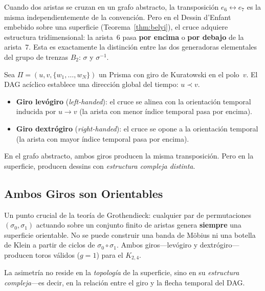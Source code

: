 \documentclass[11pt, a4paper, openany]{book}
\begin{document}
Cuando dos aristas se cruzan en un grafo abstracto, la transposici\'on
$e_6 \leftrightarrow e_7$ es la misma independientemente de la
convenci\'on. Pero en el Dessin d'Enfant embebido sobre una superficie
(Teorema~\ref{thm:belyi}), el cruce adquiere estructura
tridimensional: la arista~6 pasa \textbf{por encima} o
\textbf{por debajo} de la arista~7. Esta es exactamente la distinci\'on
entre las dos generadoras elementales del grupo de trenzas $B_2$:
$\sigma$ y $\sigma^{-1}$.

\begin{definition}
\label{def:twist-chirality}
Sea $\Pi = (u, v, \{w_1, \ldots, w_N\})$ un Prisma con giro de
Kuratowski en el polo~$v$. El DAG ac\'iclico establece una direcci\'on
global del tiempo: $u \prec v$.
\begin{itemize}
  \item \textbf{Giro lev\'ogiro} (\emph{left-handed}): el cruce se
    alinea con la orientaci\'on temporal inducida por $u \to v$
    (la arista con menor \'indice temporal pasa por encima).
  \item \textbf{Giro dextr\'ogiro} (\emph{right-handed}): el cruce se
    opone a la orientaci\'on temporal (la arista con mayor \'indice
    temporal pasa por encima).
\end{itemize}
\end{definition}

En el grafo abstracto, ambos giros producen la misma transposici\'on.
Pero en la superficie, producen dessins con \emph{estructura compleja
distinta}.

\subsection{Ambos Giros son Orientables}

Un punto crucial de la teor\'ia de Grothendieck: cualquier par de
permutaciones $(\sigma_0, \sigma_1)$ actuando sobre un conjunto
finito de aristas genera \textbf{siempre} una superficie orientable.
No se puede construir una banda de M\"obius ni una botella de Klein a
partir de ciclos de $\sigma_0 \circ \sigma_1$. Ambos giros---lev\'ogiro
y dextr\'ogiro---producen toros v\'alidos ($g = 1$) para el $K_{2,4}$.

La asimetr\'ia no reside en la \emph{topolog\'ia} de la superficie,
sino en su \emph{estructura compleja}---es decir, en la relaci\'on
entre el giro y la flecha temporal del DAG.
\end{document}
